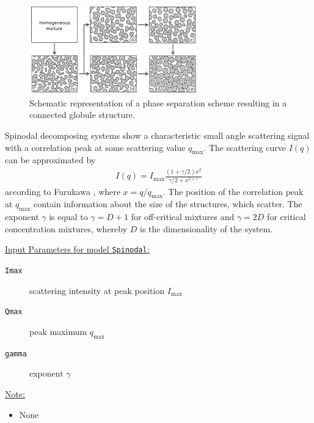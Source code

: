\begin{figure}[htb]
\begin{center}
\includegraphics[width=0.648\textwidth]{spinodal2.png}
\end{center}
\caption{Schematic representation of a phase separation scheme
resulting in a connected globule structure.} \label{Spinodal}
\end{figure}

Spinodal decomposing systems show a characteristic small angle
scattering signal with a correlation peak at some scattering value
$q_\text{max}$. The scattering curve $I(q)$ can be approximated by
\begin{align}
I(q) = I_\text{max} \frac{(1+\gamma/2)x^2}{\gamma/2+x^{2+\gamma}}
\end{align}
according to Furukawa \cite{Furukawa1984}, where $x=q/q_\text{max}$.
The position of the correlation peak at $q_\text{max}$ contain
information about the size of the structures, which scatter. The
exponent $\gamma$ is equal to $\gamma=D+1$ for off-critical mixtures
and $\gamma=2D$ for critical concentration mixtures, whereby $D$ is
the dimensionality of the system.

\vspace{5mm}

\underline{Input Parameters for model \texttt{Spinodal}:}
\begin{description}
\item[\texttt{Imax}] scattering intensity at peak position $I_\text{max}$
\item[\texttt{Qmax}] peak maximum $q_\text{max}$
\item[\texttt{gamma}] exponent $\gamma$
\end{description}

\underline{Note:}
\begin{itemize}
\item None
\end{itemize}



